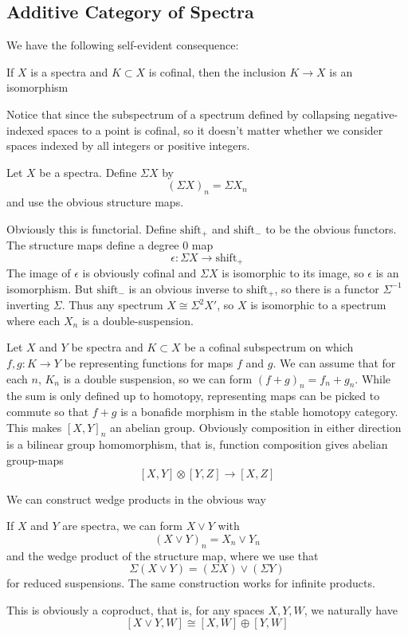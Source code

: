 \subsection{Additive Category of Spectra}

We have the following self-evident consequence:
\begin{Lemma}
  If $X$ is a spectra and $K\subset X$ is cofinal, then the inclusion $K\to X$ is an isomorphism
\end{Lemma}

Notice that since the subspectrum of a spectrum defined by collapsing negative-indexed spaces to a point is cofinal, so it doesn't matter whether we consider spaces indexed by all integers or positive integers.  

\begin{Def}
  Let $X$ be a spectra.  Define $\Sigma X$ by
  \[(\Sigma X)_n=\Sigma X_n\]
  and use the obvious structure maps.
\end{Def}
Obviously this is functorial.  
Define $\mbox{shift}_+$ and $\mbox{shift}_-$ to be the obvious functors.  
The structure maps define a degree 0 map 
\[\epsilon:\Sigma X\to \mbox{shift}_+\]
The image of $\epsilon$ is obviously cofinal and $\Sigma X$ is isomorphic to its image, so $\epsilon$ is an isomorphism.  
But $\mbox{shift}_-$ is an obvious inverse to $\mbox{shift}_+$, so there is a functor $\Sigma^{-1}$ inverting $\Sigma$.  
Thus any spectrum $X\cong\Sigma^2 X'$, so $X$ is isomorphic to a spectrum where each $X_n$ is a double-suspension.  

Let $X$ and $Y$ be spectra and $K\subset X$ be a cofinal subspectrum on which $f,g:K\to Y$ be representing functions for maps $f$ and $g$.  
We can assume that for each $n$, $K_n$ is a double suspension, so we can form $(f+g)_n=f_n+g_n$.  
While the sum is only defined up to homotopy, representing maps can be picked to commute so that $f+g$ is a bonafide morphism in the stable homotopy category.  
This makes $[X,Y]_n$ an abelian group.  
Obviously composition in either direction is a bilinear group homomorphism, that is, function composition gives abelian group-maps
\[[X,Y]\otimes [Y,Z]\to [X,Z]\]

We can construct wedge products in the obvious way
\begin{Def}
  If $X$ and $Y$ are spectra, we can form $X\vee Y$ with
  \[(X\vee Y)_n=X_n\vee Y_n\]
  and the wedge product of the structure map, where we use that
  \[\Sigma(X\vee Y)=(\Sigma X)\vee (\Sigma Y)\]
  for reduced suspensions.  The same construction works for infinite products.  
\end{Def}
This is obviously a coproduct, that is, for any spaces $X,Y,W$, we naturally have
\[[X\vee Y,W]\cong [X,W]\oplus [Y,W]\]



